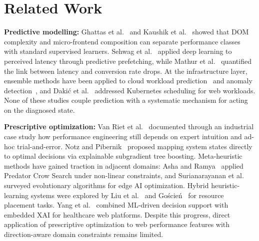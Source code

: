 \documentclass{svproc}
\begin{document}
\section{Related Work}

\textbf{Predictive modelling:} Ghattas et al.~\cite{ghattas2025} and Kaushik et al.~\cite{kaushik2024} showed that DOM complexity and micro-frontend composition can separate performance classes with standard supervised learners. Sehwag et al.~\cite{sehwag2024} applied deep learning to perceived latency through predictive prefetching, while Mathur et al.~\cite{mathur2024} quantified the link between latency and conversion rate drops. At the infrastructure layer, ensemble methods have been applied to cloud workload prediction~\cite{huang2023} and anomaly detection~\cite{xin2023}, and Daki\'{c} et al.~\cite{dakic2025} addressed Kubernetes scheduling for web workloads. None of these studies couple prediction with a systematic mechanism for acting on the diagnosed state.

\textbf{Prescriptive optimization:} Van Riet et al.~\cite{vanriet2023} documented through an industrial case study how performance engineering still depends on expert intuition and ad-hoc trial-and-error. Notz and Pibernik~\cite{notz2024} proposed mapping system states directly to optimal decisions via explainable subgradient tree boosting. Meta-heuristic methods have gained traction in adjacent domains: Asha and Ramya~\cite{asha2025} applied Predator Crow Search under non-linear constraints, and Surianarayanan et al.~\cite{surianarayanan2023} surveyed evolutionary algorithms for edge AI optimization. Hybrid heuristic-learning systems were explored by Liu et al.~\cite{liu2023} and Go\'{s}cie\'{n}~\cite{goscien2025} for resource placement tasks. Yang et al.~\cite{yang2025} combined ML-driven decision support with embedded XAI for healthcare web platforms. Despite this progress, direct application of prescriptive optimization to web performance features with direction-aware domain constraints remains limited.
\end{document}
